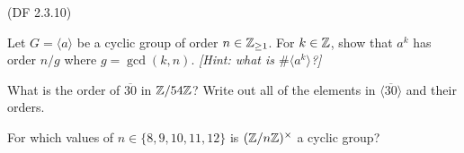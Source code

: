 \begin{problem} \textsf{(DF 2.3.10)}
  
  \noindent
  \begin{enumalph}
    \item Let $G=\langle a \rangle$ be a cyclic group of order $n \in \mathbb{Z}_{\geq 1}$.  
      For $k \in \mathbb{Z}$, show that $a^k$ has order $n/g$ where $g=\gcd(k,n)$.  \emph{[Hint: 
      what is $\#\langle a^k \rangle$?]}
    \item What is the order of $\overline{30}$ in $\mathbb{Z}/54\mathbb{Z}$?  Write out all of the 
      elements in $\langle \overline{30} \rangle$ and their orders.  
    \item For which values of $n \in \{8,9,10,11,12\}$ is
      $(\mathbb{Z}/n\mathbb{Z})^\times$ a cyclic group?  
  \end{enumalph}
\end{problem}
